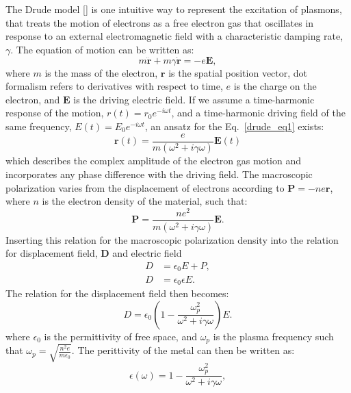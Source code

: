 The Drude model [\cite{Drude:00}] is one intuitive way to represent the excitation of plasmons, that treats the motion of electrons as a free electron gas that oscillates in response to an external electromagnetic field with a characteristic damping rate, $\gamma$. The equation of motion can be written as:
\begin{equation}
m\ddot{\mathbf{r}}+m\gamma\dot{\mathbf{r}} = -e\mathbf{E},
\label{drude_eq1}
\end{equation}
where $m$ is the mass of the electron, $\mathbf{r}$ is the spatial position vector, dot formalism refers to derivatives with respect to time, $e$ is the charge on the electron, and $\mathbf{E}$ is the driving electric field. If we assume a time-harmonic response of the motion, $r(t) = r_0e^{-i\omega t}$, and a time-harmonic driving field of the same frequency, $E(t) = E_0e^{-i\omega t}$, an ansatz for the Eq.~\ref{drude_eq1} exists:
\begin{equation}
\mathbf{r}(t) = \frac{e}{m(\omega^2+i\gamma\omega)}\mathbf{E}(t)
\end{equation}
which describes the complex amplitude of the electron gas motion and incorporates any phase difference with the driving field. The macroscopic polarization varies from the displacement of electrons according to $\mathbf{P}=-ne\mathbf{r}$, where $n$ is the electron density of the material, such that:
\begin{equation}
\mathbf{P} = \frac{ne^2}{m(\omega^2+i\gamma\omega)}\mathbf{E}.
\end{equation}
Inserting this relation for the macroscopic polarization density into the relation for displacement field, $\mathbf{D}$ and electric field
\begin{equation}
\begin{split}
D &= \epsilon_0 E+P,\\
D &= \epsilon_0 \epsilon E.
\end{split}
\end{equation}
The relation for the displacement field then becomes:
\begin{equation}
D = \epsilon_0(1-\frac{\omega_p^2}{\omega^2+i\gamma\omega})E.
\end{equation}
where $\epsilon_0$ is the permittivity of free space, and $\omega_p$ is the plasma frequency such that $\omega_p = \sqrt{\frac{n^2e}{m\epsilon_0}}$.
The perittivity of the metal can then be written as:
\begin{equation}
\epsilon(\omega) = 1-\frac{\omega_p^2}{\omega^2+i\gamma\omega},
\end{equation}
